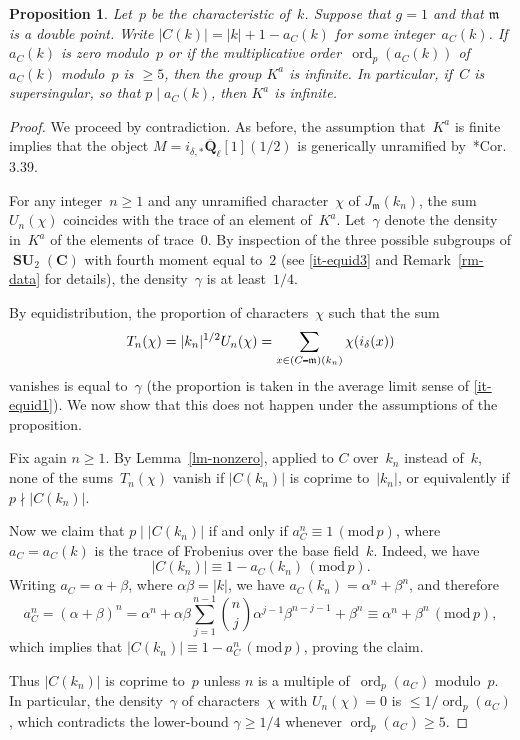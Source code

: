 \documentclass[12pt]{amsart}
\renewcommand{\leq}{\leqslant}
\renewcommand{\geq}{\geqslant}
\numberwithin{equation}{section}
\def\setminus{\mathchoice
    {\mathbin{\vrule height .62ex width 1.61ex depth -.38ex}}%
    {\mathbin{\vrule height .62ex width 1.61ex depth -.38ex}}%
    {\mathbin{\vrule height .50ex width 0.85ex depth -.28ex}}%
    {\mathbin{\vrule height .20ex width 0.570ex depth -.24ex}}%
}
\newcommand{\Cc}{\mathbf{C}}
\newcommand{\Qq}{\mathbf{Q}}
\newcommand{\bQl}{\overline{\Qq}_{\ell}}
\newcommand{\mods}[1]{\,(\mathrm{mod}\,{#1})}
\newcommand{\mfm}{\mathfrak{m}}
\DeclareMathOperator{\ord}{ord}
\DeclareMathOperator{\SU}{\mathbf{SU}}
\theoremstyle{plain}
\newtheorem{proposition}[theorem]{Proposition}
\theoremstyle{remark}
\theoremstyle{definition}
\renewcommand{\geq}{\geqslant}
\renewcommand{\leq}{\leqslant}
\begin{document}
\begin{proposition}\label{pr-infinite2}
  Let~$p$ be the characteristic of~$k$.  Suppose that $g=1$ and that
  $\mfm$ is a double point. Write $|C(k)|=|k|+1-a_C(k)$ for some
  integer~$a_C(k)$. If $a_C(k)$ is zero modulo~$p$ or if the
  multiplicative order~$\ord_p(a_C(k))$ of $a_C(k)$ modulo~$p$ is
  $\geq 5$, then the group $K^a$ is infinite. In particular, if~$C$ is
  supersingular, so that $p\mid a_C(k)$, then $K^a$ is infinite.
\end{proposition}

\begin{proof}
  We proceed by contradiction.  As before, the assumption that~$K^a$ is
  finite implies that the object $M=i_{\delta,*}\bQl[1](1/2)$ is
  generically unramified by~\cite{ffk}*{Cor.\,3.39}.

  For any integer~$n\geq 1$ and any unramified character~$\chi$ of
  $J_{\mfm}(k_n)$, the sum $U_n(\chi)$ coincides with the trace of an
  element of~$K^a$. Let~$\gamma$ denote the density in~$K^a$ of the
  elements of trace~$0$. By inspection of the three possible subgroups
  of $\SU_2(\Cc)$ with fourth moment equal to~$2$ (see \cref{it-equid3} and Remark~\ref{rm-data} for details), the
  density~$\gamma$ is at least~$1/4$.
 
  By equidistribution, the proportion of characters~$\chi$ such that the
  sum
  \[
    T_n(\chi)=|k_n|^{1/2}U_n(\chi)= \sum_{x\in (C\setminus
      \mfm)(k_n)}\chi(i_{\delta}(x))
  \]
 vanishes is equal to~$\gamma$ (the proportion is taken in the
  average limit sense of \cref{it-equid1}). We now show that this does not happen under the assumptions of the
  proposition.

  Fix again $n\geq 1$. By Lemma~\ref{lm-nonzero}, applied to $C$
  over~$k_n$ instead of~$k$, none of the sums~$T_n(\chi)$ vanish if
  $|C(k_n)|$ is coprime to~$|k_n|$, or equivalently if
  $p\nmid |C(k_n)|$.
  
  Now we claim that $p\mid |C(k_n)|$ if and only if
  $a_C^n\equiv 1\mods{p}$, where $a_C=a_C(k)$ is the trace of Frobenius
  over the base field~$k$. Indeed, we have 
  \[
    |C(k_n)|\equiv 1-a_C(k_n)\mods{p}. 
  \]
  Writing $a_C=\alpha+\beta$, where
  $\alpha\beta=|k|$, we have $a_C(k_n)=\alpha^n+\beta^n$, and therefore
  \[
    a_C^n=(\alpha+\beta)^n=\alpha^n+\alpha\beta\sum_{j=1}^{n-1}
    \binom{n}{j}\alpha^{j-1}\beta^{n-j-1}+\beta^n\equiv
    \alpha^n+\beta^n\mods{p},
  \]
  which implies that $|C(k_n)|\equiv 1-a_C^n\mods{p}$, proving the
  claim.

  Thus $|C(k_n)|$ is coprime to~$p$ unless $n$ is a multiple
  of~$\ord_p(a_C)$ modulo~$p$. In particular, the
  density~$\gamma$ of characters~$\chi$ with $U_n(\chi)=0$ is
  $\leq 1/{\ord_p(a_C)}$, which contradicts the lower-bound
  $\gamma\geq 1/4$ whenever $\ord_p(a_C)\geq 5$.
\end{proof}
\end{document}

